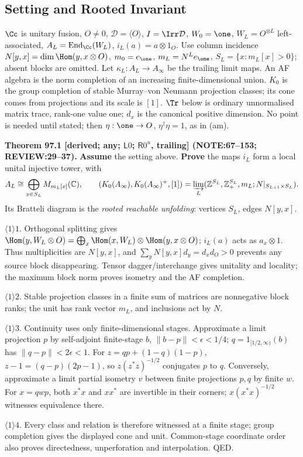 \subsection{Setting and Rooted Invariant}

\(\Cc\) is unitary fusion, \(O\ne0\), \(\mathcal D=\langle O\rangle\), \(I=\Irr\mathcal D\), \(W_0=\one\),
\(W_L=O^{\otimes L}\) left-associated, \(A_L=\operatorname{End}_\Cc(W_L)\), \(i_L(a)=a\otimes1_O\).
Use column incidence \(N[y,x]=\dim\Hom(y,x\otimes O)\), \(m_0=e_\one\), \(m_L=N^Le_\one\),
\(S_L=\{x:m_L[x]>0\}\); absent blocks are omitted. Let \(\kappa_L:A_L\to A_\infty\) be the trailing limit maps.
An AF algebra is the norm completion of an increasing finite-dimensional union. \(K_0\) is the group completion
of stable Murray--von Neumann projection classes; its cone comes from projections and its scale is \([1]\).
\(\Tr\) below is ordinary unnormalised matrix trace, rank-one value one; \(d_x\) is the canonical positive dimension.
No point is needed until stated; then \(\eta:\one\to O\), \(\eta^\dagger\eta=1\), as in (am).

\textbf{Theorem 97.1 [derived; any; \(\mathsf L0\); \(\mathsf R0^u\), trailing] (NOTE:67--153; REVIEW:29--37).}
\textbf{Assume} the setting above. \textbf{Prove} the maps \(i_L\) form a local unital injective tower, with
\[
 A_L\cong\bigoplus_{x\in S_L}M_{m_L[x]}(\mathbb C),\qquad
 (K_0(A_\infty),K_0(A_\infty)^+,[1])=\varinjlim_L(\mathbb Z^{S_L},\mathbb Z_+^{S_L},m_L;N|_{S_{L+1}\times S_L}).
\]
Its Bratteli diagram is the \emph{rooted reachable unfolding}: vertices \(S_L\), edges \(N[y,x]\).
\par\(\langle1\rangle1\). Orthogonal splitting gives
\(\Hom(y,W_L\otimes O)=\bigoplus_x\Hom(x,W_L)\otimes\Hom(y,x\otimes O)\); \(i_L(a)\) acts as \(a_x\otimes1\).
Thus multiplicities are \(N[y,x]\), and \(\sum_yN[y,x]d_y=d_xd_O>0\) prevents any source block disappearing.
Tensor dagger/interchange gives unitality and locality; the maximum block norm proves isometry and the AF completion.
\par\(\langle1\rangle2\). Stable projection classes in a finite sum of matrices are nonnegative block ranks;
the unit has rank vector \(m_L\), and inclusions act by \(N\).
\par\(\langle1\rangle3\). Continuity uses only finite-dimensional stages. Approximate a limit projection \(p\)
by self-adjoint finite-stage \(b\), \(\|b-p\|<\epsilon<1/4\); \(q=1_{[1/2,\infty)}(b)\) has \(\|q-p\|<2\epsilon<1\).
For \(z=qp+(1-q)(1-p)\), \(z-1=(q-p)(2p-1)\), so \(z(z^*z)^{-1/2}\) conjugates \(p\) to \(q\).
Conversely, approximate a limit partial isometry \(v\) between finite projections \(p,q\) by finite \(w\).
For \(x=qwp\), both \(x^*x\) and \(xx^*\) are invertible in their corners; \(x(x^*x)^{-1/2}\) witnesses equivalence there.
\par\(\langle1\rangle4\). Every class and relation is therefore witnessed at a finite stage; group completion gives
the displayed cone and unit. Common-stage coordinate order also proves directedness, unperforation and interpolation. QED.

